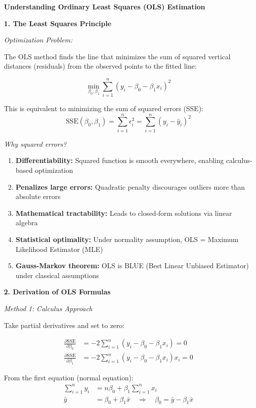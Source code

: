 \documentclass[12pt]{article}
\begin{document}
\begin{explanation}
\textbf{Understanding Ordinary Least Squares (OLS) Estimation}

\textbf{1. The Least Squares Principle}

\textit{Optimization Problem:}

The OLS method finds the line that minimizes the sum of squared vertical distances (residuals) from the observed points to the fitted line:

\[
\min_{\beta_0, \beta_1} \sum_{i=1}^{n} (y_i - \beta_0 - \beta_1 x_i)^2
\]

This is equivalent to minimizing the sum of squared errors (SSE):
\[
\text{SSE}(\beta_0, \beta_1) = \sum_{i=1}^{n} \epsilon_i^2 = \sum_{i=1}^{n} (y_i - \hat{y}_i)^2
\]

\textit{Why squared errors?}

\begin{enumerate}
    \item \textbf{Differentiability:} Squared function is smooth everywhere, enabling calculus-based optimization
    \item \textbf{Penalizes large errors:} Quadratic penalty discourages outliers more than absolute errors
    \item \textbf{Mathematical tractability:} Leads to closed-form solutions via linear algebra
    \item \textbf{Statistical optimality:} Under normality assumption, OLS = Maximum Likelihood Estimator (MLE)
    \item \textbf{Gauss-Markov theorem:} OLS is BLUE (Best Linear Unbiased Estimator) under classical assumptions
\end{enumerate}

\textbf{2. Derivation of OLS Formulas}

\textit{Method 1: Calculus Approach}

Take partial derivatives and set to zero:

\begin{align*}
\frac{\partial \text{SSE}}{\partial \beta_0} &= -2\sum_{i=1}^{n}(y_i - \beta_0 - \beta_1 x_i) = 0 \\
\frac{\partial \text{SSE}}{\partial \beta_1} &= -2\sum_{i=1}^{n}(y_i - \beta_0 - \beta_1 x_i)x_i = 0
\end{align*}

From the first equation (normal equation):
\begin{align*}
\sum_{i=1}^{n} y_i &= n\beta_0 + \beta_1 \sum_{i=1}^{n} x_i \\
\bar{y} &= \beta_0 + \beta_1 \bar{x} \quad \Rightarrow \quad \beta_0 = \bar{y} - \beta_1 \bar{x}
\end{align*}


\end{explanation}
\end{document}
